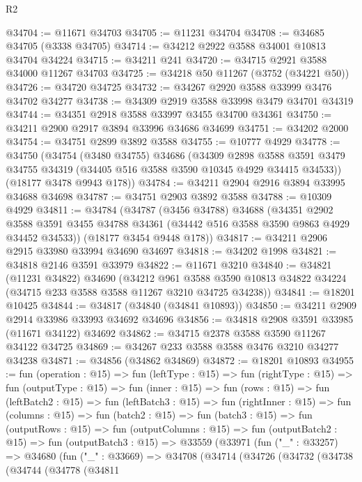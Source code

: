 \begin{lexlean}{R2}
\begin{coremodule}
@34704 := @11671 @34703
@34705 := @11231 @34704
@34708 := @34685 @34705 (@3338 @34705)
@34714 := @34212 @2922 @3588 @34001 @10813 @34704 @34224
@34715 := @34211 @241
@34720 := @34715 @2921 @3588 @34000 @11267 @34703
@34725 := @34218 @50 @11267 (@3752 (@34221 @50))
@34726 := @34720 @34725
@34732 := @34267 @2920 @3588 @33999 @3476 @34702 @34277
@34738 := @34309 @2919 @3588 @33998 @3479 @34701 @34319
@34744 := @34351 @2918 @3588 @33997 @3455 @34700 @34361
@34750 := @34211 @2900 @2917 @3894 @33996 @34686 @34699
@34751 := @34202 @2000
@34754 := @34751 @2899 @3892 @3588
@34755 := @10777 @4929
@34778 := @34750
    (@34754
      (@3480 @34755)
      @34686
      (@34309
        @2898
        @3588
        @3591
        @3479
        @34755
        @34319
        (@34405 @516 @3588 @3590 @10345 @4929 @34415 @34533))
      (@18177 @3478 @9943 @178))
@34784 := @34211 @2904 @2916 @3894 @33995 @34688 @34698
@34787 := @34751 @2903 @3892 @3588
@34788 := @10309 @4929
@34811 := @34784
    (@34787
      (@3456 @34788)
      @34688
      (@34351
        @2902
        @3588
        @3591
        @3455
        @34788
        @34361
        (@34442 @516 @3588 @3590 @9863 @4929 @34452 @34533))
      (@18177 @3454 @9448 @178))
@34817 := @34211 @2906 @2915 @33980 @33994 @34690 @34697
@34818 := @34202 @1998
@34821 := @34818 @2146 @3591 @33979
@34822 := @11671 @3210
@34840 := @34821
    (@11231 @34822)
    @34690
    (@34212
      @961
      @3588
      @3590
      @10813
      @34822
      @34224
      (@34715 @233 @3588 @3588 @11267 @3210 @34725 @34238))
@34841 := @18201 @10425
@34844 := @34817 (@34840 (@34841 @10893))
@34850 := @34211 @2909 @2914 @33986 @33993 @34692 @34696
@34856 := @34818 @2908 @3591 @33985 (@11671 @34122) @34692
@34862 := @34715 @2378 @3588 @3590 @11267 @34122 @34725
@34869 := @34267 @233 @3588 @3588 @3476 @3210 @34277 @34238
@34871 := @34856 (@34862 @34869)
@34872 := @18201 @10893
@34955 := fun (operation : @15) =>
  fun (leftType : @15) =>
  fun (rightType : @15) =>
  fun (outputType : @15) =>
  fun (inner : @15) =>
  fun (rows : @15) =>
  fun (leftBatch2 : @15) =>
  fun (leftBatch3 : @15) =>
  fun (rightInner : @15) =>
  fun (columns : @15) =>
  fun (batch2 : @15) =>
  fun (batch3 : @15) =>
  fun (outputRows : @15) =>
  fun (outputColumns : @15) =>
  fun (outputBatch2 : @15) =>
  fun (outputBatch3 : @15) =>
  @33559
    (@33971
      (fun ("_" : @33257) =>
      @34680
        (fun ("_" : @33669) =>
        @34708
          (@34714
            (@34726
              (@34732
                (@34738
                  (@34744
                    (@34778
                      (@34811

\end{coremodule}
\end{lexlean}

